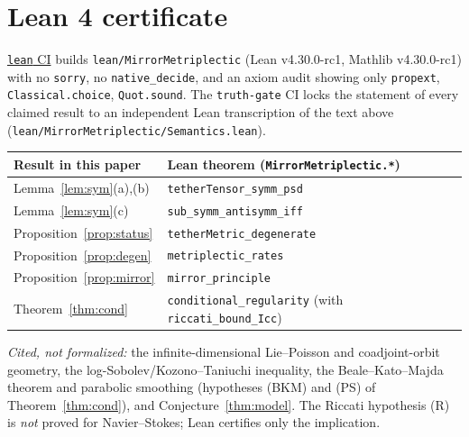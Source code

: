 \documentclass[11pt]{amsart}
\theoremstyle{definition}\newtheorem{definition}[theorem]{Definition}
\theoremstyle{remark}\newtheorem{remark}[theorem]{Remark}
\begin{document}
\appendix
\section{Lean 4 certificate}\label{app:lean}
\href{https://github.com/BenFrohman/frohmanian-tether-manuscript-2026-06-01/actions/workflows/lean.yml}{\texttt{lean} CI} builds
\texttt{lean/MirrorMetriplectic} (Lean v4.30.0-rc1, Mathlib v4.30.0-rc1) with no \texttt{sorry}, no \texttt{native\_decide}, and an
axiom audit showing only \texttt{propext}, \texttt{Classical.choice}, \texttt{Quot.sound}. The \texttt{truth-gate} CI locks the statement
of every claimed result to an independent Lean transcription of the text above (\texttt{lean/MirrorMetriplectic/Semantics.lean}).
\begin{center}\small
\begin{tabular}{ll}\toprule
Result in this paper & Lean theorem (\texttt{MirrorMetriplectic.*})\\\midrule
Lemma~\ref{lem:sym}(a),(b) & \texttt{tetherTensor\_symm\_psd}\\
Lemma~\ref{lem:sym}(c) & \texttt{sub\_symm\_antisymm\_iff}\\
Proposition~\ref{prop:status} & \texttt{tetherMetric\_degenerate}\\
Proposition~\ref{prop:degen} & \texttt{metriplectic\_rates}\\
Proposition~\ref{prop:mirror} & \texttt{mirror\_principle}\\
Theorem~\ref{thm:cond} & \texttt{conditional\_regularity} (with \texttt{riccati\_bound\_Icc})\\\bottomrule
\end{tabular}\end{center}
\emph{Cited, not formalized:} the infinite-dimensional Lie--Poisson and coadjoint-orbit geometry, the log-Sobolev/Kozono--Taniuchi
inequality, the Beale--Kato--Majda theorem and parabolic smoothing (hypotheses (BKM) and (PS) of Theorem~\ref{thm:cond}), and
Conjecture~\ref{thm:model}. The Riccati hypothesis (R) is \emph{not} proved for Navier--Stokes; Lean certifies only the implication.
\end{document}
